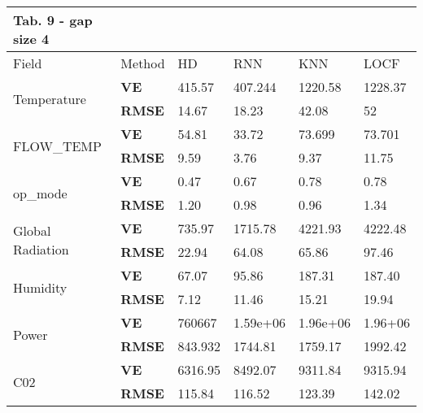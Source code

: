 \documentclass[9.5pt,article,twocolumn]{article}
\begin{document}
{{\begin{tabular}{llllll}
\textbf{Tab. 9 -} gap size 4
\\
\hline
\multicolumn{1}{l}{Field}   & Method & HD & RNN & KNN & LOCF \\
\hline
\multirow{2}{*}{Temperature}      & \textbf{VE}   & 415.57  & 407.244     & 1220.58     & 1228.37     \\
                                  & \textbf{RMSE} & 14.67   & 18.23       & 42.08       & 52          \\
\multirow{2}{*}{FLOW\_TEMP}       & \textbf{VE}   & 54.81   & 33.72       & 73.699      & 73.701      \\
                                  & \textbf{RMSE} & 9.59    & 3.76        & 9.37        & 11.75       \\
\multirow{2}{*}{op\_mode}         & \textbf{VE}   & 0.47    & 0.67        & 0.78        & 0.78        \\
                                  & \textbf{RMSE} & 1.20    & 0.98        & 0.96        & 1.34        \\
\multirow{2}{*}{Global Radiation} & \textbf{VE}   & 735.97  & 1715.78     & 4221.93     & 4222.48     \\
                                  & \textbf{RMSE} & 22.94   & 64.08       & 65.86       & 97.46       \\
\multirow{2}{*}{Humidity}         & \textbf{VE}   & 67.07   & 95.86       & 187.31      & 187.40      \\
                                  & \textbf{RMSE} & 7.12    & 11.46       & 15.21       & 19.94       \\
\multirow{2}{*}{Power}            & \textbf{VE}   & 760667  & 1.59e+06      & 1.96e+06       & 1.96+06 \\
                                  & \textbf{RMSE} & 843.932 & 1744.81     & 1759.17     & 1992.42     \\
\multirow{2}{*}{C02}              & \textbf{VE}   & 6316.95 & 8492.07     & 9311.84     & 9315.94     \\
                                  & \textbf{RMSE} & 115.84  & 116.52      & 123.39      & 142.02      \\
\hline                            
\end{tabular}
}

}
\end{document}
